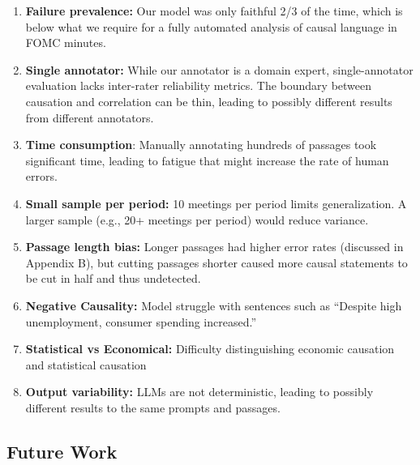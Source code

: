 \documentclass[11pt]{article}
\begin{document}
\begin{enumerate}
    \item \textbf{Failure prevalence:} Our model was only faithful 2/3 of the time, which is below what we require for a fully automated analysis of causal language in FOMC minutes.
    
    \item \textbf{Single annotator:} While our annotator is a domain expert, single-annotator evaluation lacks inter-rater reliability metrics. The boundary between causation and correlation can be thin, leading to possibly different results from different annotators.

    \item \textbf{Time consumption}: Manually annotating hundreds of passages took significant time, leading to fatigue that might increase the rate of human errors. 
    
    \item \textbf{Small sample per period:} 10 meetings per period limits generalization. A larger sample (e.g., 20+ meetings per period) would reduce variance.
    
    \item \textbf{Passage length bias:} Longer passages had higher error rates (discussed in Appendix B), but cutting passages shorter caused more causal statements to be cut in half and thus undetected.
    
    \item \textbf{Negative Causality:} Model struggle with sentences such as “Despite high unemployment, consumer spending increased.”

    \item \textbf{Statistical vs Economical:} Difficulty distinguishing economic causation and statistical causation

    \item \textbf{Output variability:} LLMs are not deterministic, leading to possibly different results to the same prompts and passages.
\end{enumerate}

\subsection{Future Work}
\end{document}
